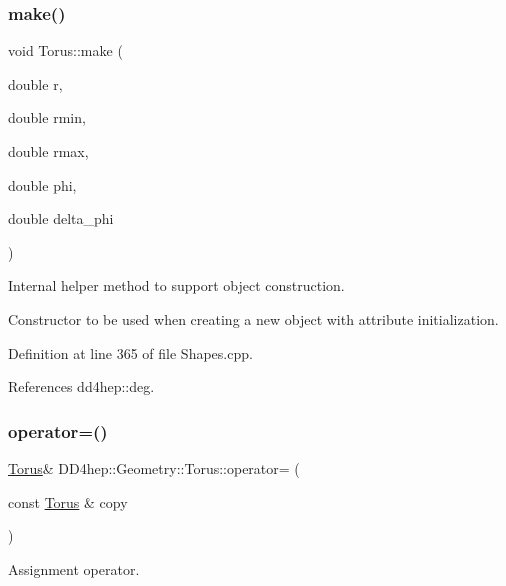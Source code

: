 \subsubsection{\texorpdfstring{make()}{make()}}
{\footnotesize\ttfamily void Torus\+::make (\begin{DoxyParamCaption}\item[{double}]{r,  }\item[{double}]{rmin,  }\item[{double}]{rmax,  }\item[{double}]{phi,  }\item[{double}]{delta\+\_\+phi }\end{DoxyParamCaption})\hspace{0.3cm}{\ttfamily [private]}}



Internal helper method to support object construction. 

Constructor to be used when creating a new object with attribute initialization. 

Definition at line 365 of file Shapes.\+cpp.



References dd4hep\+::deg.

\hypertarget{class_d_d4hep_1_1_geometry_1_1_torus_a73b9809f6a7e125ff1b6a850aed1fda1}{}\label{class_d_d4hep_1_1_geometry_1_1_torus_a73b9809f6a7e125ff1b6a850aed1fda1} 
\subsubsection{\texorpdfstring{operator=()}{operator=()}}
{\footnotesize\ttfamily \hyperlink{class_d_d4hep_1_1_geometry_1_1_torus}{Torus}\& D\+D4hep\+::\+Geometry\+::\+Torus\+::operator= (\begin{DoxyParamCaption}\item[{const \hyperlink{class_d_d4hep_1_1_geometry_1_1_torus}{Torus} \&}]{copy }\end{DoxyParamCaption})\hspace{0.3cm}{\ttfamily [default]}}



Assignment operator. 

\hypertarget{class_d_d4hep_1_1_geometry_1_1_torus_a41bf8eb0dae9ebabda620358cad1c648}{}\label{class_d_d4hep_1_1_geometry_1_1_torus_a41bf8eb0dae9ebabda620358cad1c648} 
